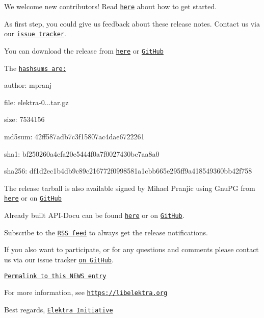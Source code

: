 We welcome new contributors! Read \href{https://www.libelektra.org/devgettingstarted/ideas}{\tt here} about how to get started.

As first step, you could give us feedback about these release notes. Contact us via our \href{https://issues.libelektra.org}{\tt issue tracker}.

You can download the release from \href{https://www.libelektra.org/ftp/elektra/releases/elektra-0.9.1.tar.gz}{\tt here} or \href{https://github.com/ElektraInitiative/ftp/blob/master/releases/elektra-0.9.1.tar.gz?raw=true}{\tt Git\+Hub}

The \href{https://github.com/ElektraInitiative/ftp/blob/master/releases/elektra-0.9.1.tar.gz.hashsum?raw=true}{\tt hashsums are\+:}


\begin{DoxyItemize}
\item author\+: mpranj
\item file\+: elektra-\/0...\+tar.\+gz
\item size\+: 7534156
\item md5sum\+: 42ff587adb7c3f15807ac4dae6722261
\item sha1\+: bf250260a4efa20e5444f0a7f0027430bc7aa8a0
\item sha256\+: df1d2ec1b4db9c89c216772f0998581a1cbb665e295ff9a418549360bb42f758
\end{DoxyItemize}

The release tarball is also available signed by Mihael Pranjic using Gnu\+PG from \href{https://www.libelektra.org/ftp/elektra/releases/elektra-0.9.1.tar.gz.gpg}{\tt here} or on \href{https://github.com/ElektraInitiative/ftp/blob/master/releases/elektra-0.9.1.tar.gz.gpg?raw=true}{\tt Git\+Hub}

Already built A\+P\+I-\/\+Docu can be found \href{https://doc.libelektra.org/api/0.9.1/html/}{\tt here} or on \href{https://github.com/ElektraInitiative/doc/tree/master/api/0.9.1}{\tt Git\+Hub}.

Subscribe to the \href{https://www.libelektra.org/news/feed.rss}{\tt R\+SS feed} to always get the release notifications.

If you also want to participate, or for any questions and comments please contact us via our issue tracker \href{http://issues.libelektra.org}{\tt on Git\+Hub}.

\href{https://www.libelektra.org/news/0.9.1-release}{\tt Permalink to this N\+E\+WS entry}

For more information, see \href{https://libelektra.org}{\tt https\+://libelektra.\+org}

Best regards, \href{https://www.libelektra.org/developers/authors}{\tt Elektra Initiative} 